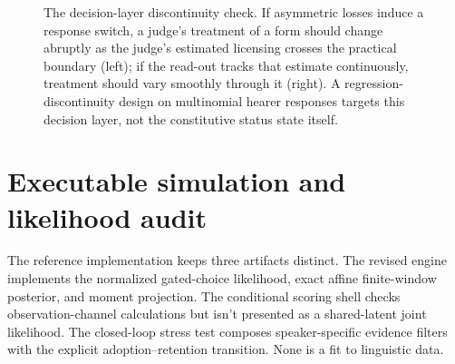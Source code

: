 \documentclass[12pt,letterpaper]{article}
\begin{document}
\begin{figure}[t]
\centering
{}
\caption{The decision-layer discontinuity check. If asymmetric losses induce a
response switch, a judge's treatment of a form should change abruptly as the
judge's estimated licensing crosses the practical boundary (left); if the
read-out tracks that estimate continuously, treatment should vary smoothly
through it (right). A regression-discontinuity design on multinomial hearer
responses targets this decision layer, not the constitutive status state itself.}
\label{fig:rd-test}
\end{figure}

\section{Executable simulation and likelihood audit}
\label{sec:executable-audit}

The reference implementation keeps three artifacts distinct. The revised
engine implements the normalized gated-choice likelihood, exact affine
finite-window posterior, and moment projection. The conditional scoring shell
checks observation-channel calculations but isn't presented as a shared-latent
joint likelihood. The closed-loop stress test composes speaker-specific
evidence filters with the explicit adoption--retention transition. None is a
fit to linguistic data.
\end{document}
